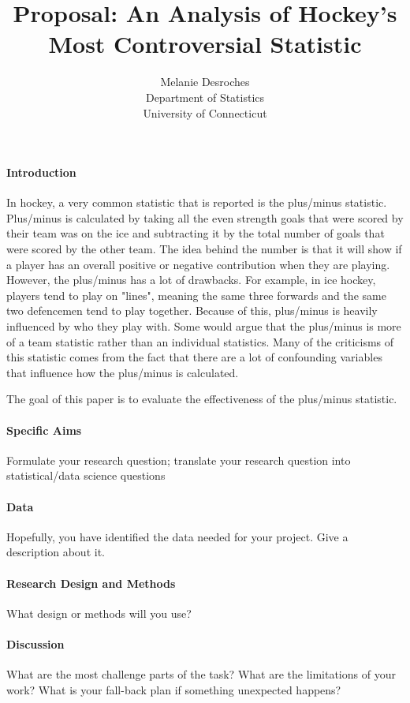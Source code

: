 \documentclass[12pt]{article}
\title{Proposal: An Analysis of Hockey's Most Controversial Statistic}
\author{Melanie Desroches\\
  Department of Statistics\\
  University of Connecticut
}
\begin{document}
\maketitle


\paragraph{Introduction}
In hockey, a very common statistic that is reported is the plus/minus statistic. Plus/minus is calculated
by taking all the even strength goals that were scored by their team was on the ice and subtracting it by 
the total number of goals that were scored by the other team. The idea behind the number is that it will 
show if a player has an overall positive or negative contribution when they are playing. However, the plus/minus
has a lot of drawbacks. For example, in ice hockey, players tend to play on "lines", meaning the same three forwards
and the same two defencemen tend to play together. Because of this, plus/minus is heavily influenced by who they
play with. Some would argue that the plus/minus is more of a team statistic rather than an individual statistics.
Many of the criticisms of this statistic comes from the fact that there are a lot of confounding variables
that influence how the plus/minus is calculated. 

The goal of this paper is to evaluate the effectiveness of the plus/minus statistic.

\paragraph{Specific Aims}
Formulate your research question;
translate your research question into statistical/data science questions

\lipsum[2]

\paragraph{Data}
Hopefully, you have identified the data needed for your project. Give a
description about it.

\lipsum[3]

\paragraph{Research Design and Methods}
What design or methods will you use?


\lipsum[4]

\paragraph{Discussion}
What are the most challenge parts of the task?
What are the limitations of your work? What is your fall-back plan if
something unexpected happens?

\lipsum[5]



\end{document}

